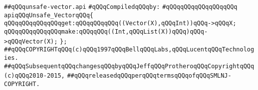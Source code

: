 \label{src/lib/std/src/unsafe/unsafe-vector.api}
\verb|##qQQqunsafe-vector.api|\newline
\newline
\verb|#qQQqCompiledqQQqby:|\newline
\verb|#qQQqqQQqqQQqqQQqqQQq|\newline
\newline
\newline
\newline
\verb|apiqQQqUnsafe_VectorqQQq{|\newline
\newline
\verb|qQQqqQQqqQQqqQQqget:qQQqqQQqqQQq((Vector(X),qQQqInt))qQQq->qQQqX;|\newline
\verb|qQQqqQQqqQQqqQQqmake:qQQqqQQq((Int,qQQqList(X))qQQq)qQQq->qQQqVector(X);|\newline
\verb|};|\newline
\newline
\newline
\newline
\newline
\verb|##qQQqCOPYRIGHTqQQq(c)qQQq1997qQQqBellqQQqLabs,qQQqLucentqQQqTechnologies.|\newline
\verb|##qQQqSubsequentqQQqchangesqQQqbyqQQqJeffqQQqProtheroqQQqCopyrightqQQq(c)qQQq2010-2015,|\newline
\verb|##qQQqreleasedqQQqperqQQqtermsqQQqofqQQqSMLNJ-COPYRIGHT.|\newline

